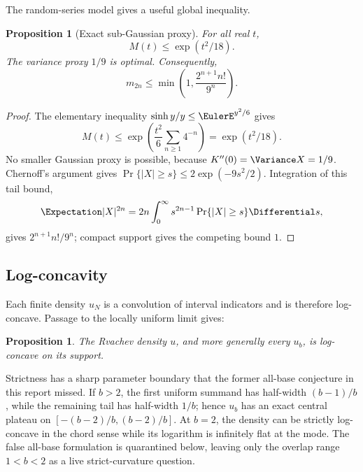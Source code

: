 \documentclass[11pt,oneside]{article}
\newtheorem{proposition}[theorem]{Proposition}
\theoremstyle{definition}
\theoremstyle{remark}
\begin{document}
The random-series model gives a useful global inequality.

\begin{proposition}[Exact sub-Gaussian proxy]
\label{prop:subgaussian}
For all real \(t\),
\begin{equation}
 M(t)\leq \exp(t^2/18).
 \label{eq:subgaussian}
\end{equation}
The variance proxy \(1/9\) is optimal.
Consequently,
\begin{equation}
 m_{2n}\leq
 \min\!\left(1,\frac{2^{n+1}n!}{9^n}\right).
 \label{eq:moment-bound}
\end{equation}
\end{proposition}

\begin{proof}
The elementary inequality
\(\sinh y/y\leq\EulerE^{y^2/6}\) gives
\[
 M(t)
 \leq
 \exp\!\left(
  \frac{t^2}{6}\sum_{n\geq1}4^{-n}
 \right)
 =\exp(t^2/18).
\]
No smaller Gaussian proxy is possible, because
\(K''(0)=\Variance X=1/9\).  Chernoff's argument gives
\(\Pr\{|X|\geq s\}\leq2\exp(-9s^2/2)\).  Integration of this tail bound,
\[
 \Expectation|X|^{2n}
 =2n\int_0^\infty s^{2n-1}\Pr\{|X|\geq s\}\Differential s,
\]
gives \(2^{n+1}n!/9^n\); compact support gives the competing bound \(1\).
\end{proof}

\subsection{Log-concavity}

Each finite density \(u_N\) is a convolution of interval indicators and is
therefore log-concave.  Passage to the locally uniform limit gives:

\begin{proposition}
The Rvachev density \(u\), and more generally every \(u_b\), is log-concave
on its support.
\end{proposition}

Strictness has a sharp parameter boundary that the former all-base conjecture
in this report missed.  If \(b>2\), the first uniform summand has half-width
\((b-1)/b\), while the remaining tail has half-width \(1/b\); hence \(u_b\)
has an exact central plateau on
\([-(b-2)/b,(b-2)/b]\).  At \(b=2\), the density can be strictly
log-concave in the chord sense while its logarithm is infinitely flat at the
mode.  The false all-base formulation is quarantined below, leaving only the
overlap range \(1<b<2\) as a live strict-curvature question.
\end{document}
